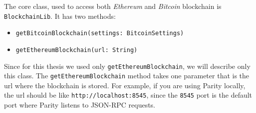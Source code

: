 The core class, used to access both \textit{Ethereum} and \textit{Bitcoin} blockchain is \texttt{BlockchainLib}. It has two methods:
\begin{itemize}
    \item \texttt{getBitcoinBlockchain(settings: BitcoinSettings)}
    \item \texttt{getEthereumBlockchain(url: String)}
\end{itemize}
Since for this thesis we used only \texttt{getEthereumBlockchain}, we will describe only this class. 
\newline
The \texttt{getEthereumBlockchain} method takes one parameter that is the url where the blockchain is stored.
For example, if you are using Parity locally, the url should be like \texttt{http://localhost:8545}, since the \texttt{8545} port is the default port where Parity listens to JSON-RPC requests.
